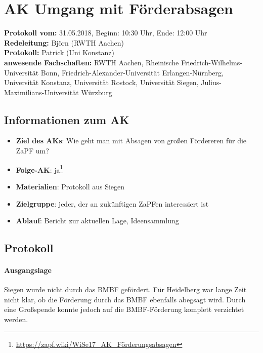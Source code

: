
\section{AK Umgang mit Förderabsagen}

	\textbf{Protokoll vom:} 31.05.2018,
	Beginn: 10:30 Uhr,
	Ende: 12:00 Uhr \\
	\textbf{Redeleitung:} Björn (RWTH Aachen) \\
	\textbf{Protokoll:} Patrick (Uni Konstanz) \\
	\textbf{anwesende Fachschaften:} RWTH Aachen, Rheinische Friedrich-Wilhelms-Universität Bonn, Friedrich-Alexander-Universität Erlangen-Nürnberg, Universität Konstanz, Universität Rostock, Universität Siegen, Julius-Maximilians-Universität Würzburg

	\subsection*{Informationen zum AK}
		\begin{itemize}
			\item \textbf{Ziel des AKs}: Wie geht man mit Absagen von großen Fördereren für die ZaPF um?
			\item \textbf{Folge-AK}: ja\footnote{\url{https://zapf.wiki/WiSe17_AK_Förderungsabsagen}}
      \item \textbf{Materialien}: Protokoll aus Siegen
			\item \textbf{Zielgruppe}: jeder, der an zukünftigen ZaPFen interessiert ist
			\item \textbf{Ablauf}: Bericht zur aktuellen Lage, Ideensammlung
		\end{itemize}

  \subsection*{Protokoll}
    \paragraph{Ausgangslage}
      Siegen wurde nicht durch das BMBF gefördert. Für Heidelberg war lange Zeit nicht klar, ob die Förderung durch das BMBF ebenfalls abegsagt wird.
      Durch eine Großspende konnte jedoch auf die BMBF-Förderung komplett verzichtet werden.

